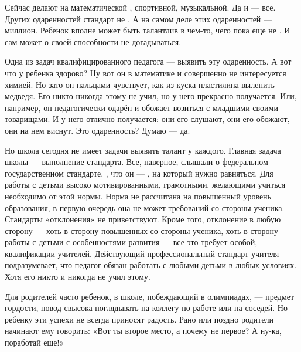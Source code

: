 Сейчас  делают на математической , спортивной, музыкальной.
Да и  --- все. Других одаренностей стандарт не . А на самом деле этих одаренностей --- миллион. Ребенок вполне может быть талантлив в чем-то, чего пока еще не . И сам может о своей способности не догадываться.

Одна из задач квалифицированного педагога --- выявить эту одаренность. А вот что у ребенка здорово? Ну вот он  в математике и совершенно не интересуется химией. Но зато он пальцами чувствует, как из куска пластилина вылепить медведя. Его никто никогда этому не учил, но у него  прекрасно получается. Или, например, он педагогически одарён и обожает возиться с младшими своими товарищами. И у него отлично получается: они его слушают, они его обожают, они на нем виснут. Это одаренность? Думаю --- да.

Но школа сегодня не имеет задачи выявить талант у каждого. Главная задача школы --- выполнение стандарта. Все, наверное, слышали о федеральном государственном стандарте. , что он ---  , на который нужно равняться.
Для работы с детьми высоко мотивированными, грамотными, желающими учиться необходимо  от этой нормы. Норма не рассчитана на повышенный уровень образования, в первую очередь она не может  требований со стороны ученика. Стандарты «отклонения» не приветствуют. Кроме того, отклонение в любую сторону --- хоть в сторону повышенных  со стороны ученика, хоть в сторону работы с детьми с особенностями развития --- все это требует особой,  квалификации учителей. Действующий профессиональный стандарт учителя подразумевает, что педагог обязан работать с любыми детьми в любых условиях. Хотя его никто и никогда не учил этому.

\begin{fancyquotes}
    Для родителей часто ребенок,   в школе, побеждающий в олимпиадах, --- предмет гордости, повод свысока поглядывать на коллегу по работе или на соседей. Но ребенку эти успехи не всегда приносят радость. Рано или поздно родители начинают ему говорить: «Вот ты  второе место, а почему не первое? А ну-ка, поработай еще!»
\end{fancyquotes}

